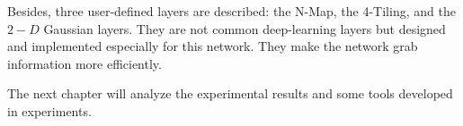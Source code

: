\begin{spacing}{1.5}
Besides, three user-defined layers are described: the N-Map, the 4-Tiling, and the $2-D$ Gaussian layers. They are not common deep-learning layers but designed and implemented especially for this network. They make the network grab information more efficiently.

The next chapter will analyze the experimental results and some tools developed in experiments.

\end{spacing}
\newpage
